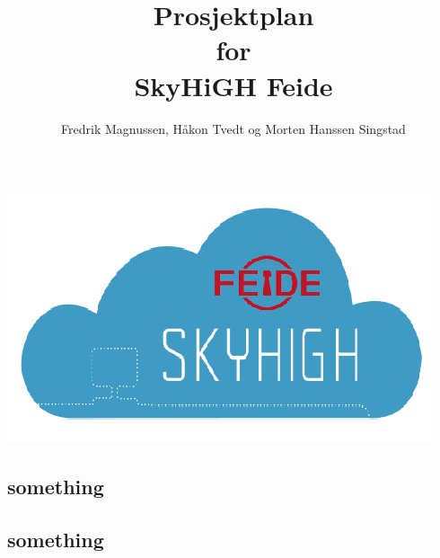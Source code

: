 \documentclass[12pt,a4paper]{article}
\begin{document}
\title{Prosjektplan \\ for \\ SkyHiGH Feide}
\author{Fredrik Magnussen, Håkon Tvedt og Morten Hanssen Singstad}
\maketitle
\begin{center}
\includegraphics[scale=1]{logo.png}
\end{center}

\newpage
\tableofcontents

\newpage
\subsection{something}

\subsection{something}
\end{document}
